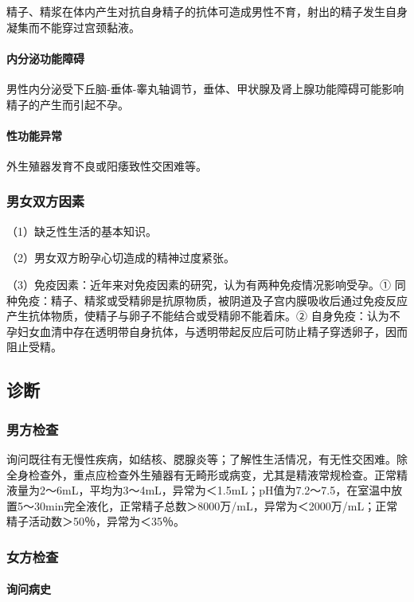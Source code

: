 精子、精浆在体内产生对抗自身精子的抗体可造成男性不育，射出的精子发生自身凝集而不能穿过宫颈黏液。
\paragraph{内分泌功能障碍}

男性内分泌受下丘脑-垂体-睾丸轴调节，垂体、甲状腺及肾上腺功能障碍可能影响精子的产生而引起不孕。
\paragraph{性功能异常}

外生殖器发育不良或阳痿致性交困难等。

\subsubsection{男女双方因素}

（1）缺乏性生活的基本知识。

（2）男女双方盼孕心切造成的精神过度紧张。

（3）免疫因素：近年来对免疫因素的研究，认为有两种免疫情况影响受孕。①
同种免疫：精子、精浆或受精卵是抗原物质，被阴道及子宫内膜吸收后通过免疫反应产生抗体物质，使精子与卵子不能结合或受精卵不能着床。②
自身免疫：认为不孕妇女血清中存在透明带自身抗体，与透明带起反应后可防止精子穿透卵子，因而阻止受精。

\subsection{诊断}

\subsubsection{男方检查}

询问既往有无慢性疾病，如结核、腮腺炎等；了解性生活情况，有无性交困难。除全身检查外，重点应检查外生殖器有无畸形或病变，尤其是精液常规检查。正常精液量为2～6mL，平均为3～4mL，异常为＜1.5mL；pH值为7.2～7.5，在室温中放置5～30min完全液化，正常精子总数＞8000万/mL，异常为＜2000万/mL；正常精子活动数＞50％，异常为＜35％。

\subsubsection{女方检查}
\paragraph{询问病史}

